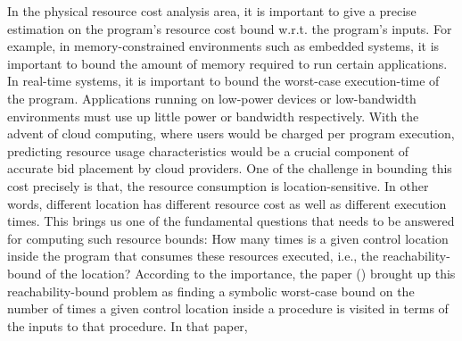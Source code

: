 In the physical resource cost analysis area, it is important to give a precise estimation
on the program's resource cost bound w.r.t. the program's inputs.
For example, in memory-constrained environments such as embedded systems,
it is important to bound the amount of memory required to run certain applications.
In real-time systems, it is important to bound the worst-case execution-time of the program.
Applications running on low-power devices or low-bandwidth environments must use up little power or bandwidth respectively. 
With the advent of cloud computing, where users would be charged per program execution,
predicting resource usage characteristics would be a crucial component of accurate bid placement by cloud providers. 
One of the challenge in bounding this cost precisely is that, the resource consumption is location-sensitive.
In other words, different location has different resource cost as well as different execution times.
This brings us one of the fundamental questions that needs to be answered for computing such resource bounds:
How many times is a given control location inside the program that consumes these resources executed, i.e., the
reachability-bound of the location?
According to the importance, the paper (\cite{GulwaniZ10}) brought up this reachability-bound problem as
finding a symbolic worst-case bound on the number of times a given control location 
inside a procedure is visited in terms of the inputs to that procedure.
    In that paper,
